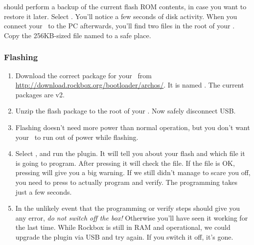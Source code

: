  should perform a
backup of the current flash ROM contents, in case you want to restore it later.
Select . You'll notice a few seconds of disk activity. When you connect your
\dap\ to the PC afterwards, you'll find two files in the root of your \dap.
Copy the 256KB-sized file named  to
a safe place.

\subsubsection{Flashing}

\begin{enumerate}
\item Download the correct package for your \dap\ from
  \url{http://download.rockbox.org/bootloader/archos/}. It is named
  .
  The current packages are v2.
\item Unzip the flash package to the root of your \dap.
  Now safely disconnect USB.
\item
  Flashing doesn't need more power than normal operation, but you don't want
  your \dap\ to run out of power while flashing.
\item Select , and run the
   plugin. It will tell you about your flash and
  which file it is going to program. After pressing
  it will check the file. If the file is OK, pressing
  will give you a big warning. If we still didn't manage to scare you off, you
  need to press 
  to actually program and verify. The programming takes just a few seconds.
\item In the unlikely event that the programming or verify steps should give
  you any error, \emph{do not switch off the box!} Otherwise you'll have seen
  it working for the last time. While Rockbox is still in RAM and operational,
  we could upgrade the plugin via USB and try again. If you switch it off,
  it's gone.
\end{enumerate}

